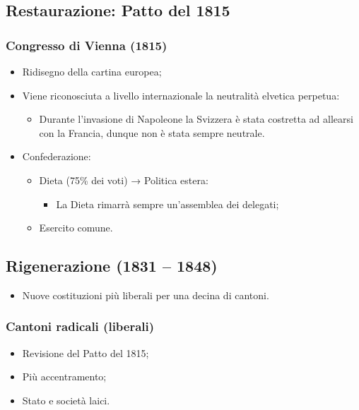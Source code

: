 \documentclass{article}
\begin{document}
\subsection{Restaurazione: Patto del 1815}

\subsubsection{Congresso di Vienna (1815)}
\begin{itemize}
    \item Ridisegno della cartina europea;
    \item Viene riconosciuta a livello internazionale la neutralità elvetica perpetua:
        \begin{itemize}
            \item Durante l’invasione di Napoleone la Svizzera è stata costretta ad allearsi con
                la Francia, dunque non è stata sempre neutrale.
        \end{itemize}
    \item Confederazione:
    \begin{itemize}
        \item Dieta (75\% dei voti) → Politica estera:
            \begin{itemize}
                \item La Dieta rimarrà sempre un’assemblea dei delegati;
            \end{itemize}
        \item Esercito comune.
    \end{itemize}
\end{itemize}

\subsection{Rigenerazione (1831 – 1848)}
\begin{itemize}
    \item Nuove costituzioni più liberali per una decina di cantoni.
\end{itemize}

\subsubsection{Cantoni radicali (liberali)}
\begin{itemize}
    \item Revisione del Patto del 1815;
    \item Più accentramento;
    \item Stato e società laici.
\end{itemize}
\end{document}
